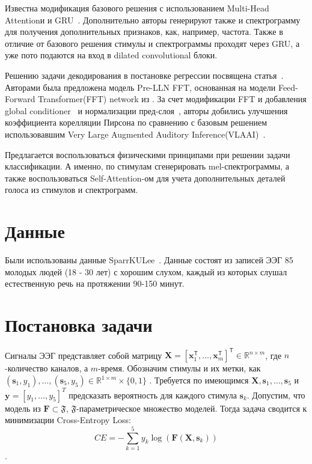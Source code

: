 \documentclass{article}
\begin{document}
    \par 
    Известна модификация базового решения с использованием Multi-Head Attentionи и GRU~\citep{multihead-gru}. Дополнительно авторы генерируют также и спектрограмму для получения дополнительных признаков, как, например, частота. Также в отличие от базового решения стимулы и спектрограммы проходят через GRU, а уже пото подаются на вход в dilated convolutional блоки. 
    \par 
    Решению задачи декодирования в постановке регрессии посвящена статья~\cite{piao2023happyquokka}. Авторами была предложена модель Pre-LLN FFT, основанная на модели Feed-Forward Transformer(FFT) network из \citep{ren2019fastspeech}. За счет модификации FFT и добавления global conditioner~\citep{vandenoord16_ssw} и нормализации пред-слоя~\citet{xiong2020layer}, авторы добились улучшения коэффициента корелляции Пирсона по сравнению с базовым решением использовавшим Very Large Augmented Auditory Inference(VLAAI)~\citep{vlaai}. 
    
    Предлагается воспользоваться физическими принципами при решении задачи классификации. А именно, по стимулам сгенерировать mel-спектрограммы, а также воспользоваться Self-Attention-ом для учета дополнительных деталей голоса из стимулов и спектрограмм. 
    
\section{Данные}
    Были использованы данные SparrKULee~\citep{K3VSND_2023}. Данные состоят из записей ЭЭГ 85 молодых людей (18 - 30 лет) с хорошим слухом, каждый из которых слушал естественную речь на протяжении 90-150 минут. 


\section{Постановка задачи}
    Сигналы ЭЭГ представляет собой матрицу $\mathbf{X}=[\mathbf{x}^{\mathsf{T}}_1,...,\mathbf{x}^{\mathsf{T}}_m]^{\mathsf{T}} \in \mathbb{R}^{n \times m}$, где $n$-количество каналов, а  $m$-время. Обозначим стимулы и их метки, как $(\mathbf{s}_1, y_1), \dots, (\mathbf{s}_5, y_5) \in \mathbb{R}^{1 \times m} \times \{ 0, 1\}$ . Требуется по имеющимся $\mathbf{X}, \mathbf{s}_1, \dots, \mathbf{s}_5$ и $\mathbf{y} = [y_1, \dots, y_5]^T$ предсказать вероятность для каждого стимула $\mathbf{s}_k$. Допустим, что модель из $\mathbf{F} \subset \mathfrak{F}$, $\mathfrak{F}$-параметрическое множество моделей. Тогда задача сводится к минимизации Cross-Entropy Loss:
    $$CE = - \sum_{k=1}^5 y_k \log (\mathbf{F}(\mathbf{X}, \mathbf{s}_k))$$.
\end{document}
